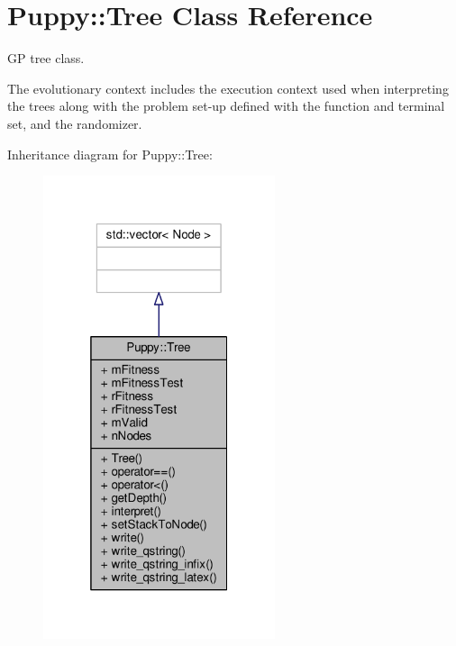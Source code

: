 \hypertarget{classPuppy_1_1Tree}{}\section{Puppy\+:\+:Tree Class Reference}
\label{classPuppy_1_1Tree}


G\+P tree class.

The evolutionary context includes the execution context used when interpreting the trees along with the problem set-\/up defined with the function and terminal set, and the randomizer.  




Inheritance diagram for Puppy\+:\+:Tree\+:
\nopagebreak
\begin{figure}[H]
\begin{center}
\leavevmode
\includegraphics[width=193pt]{classPuppy_1_1Tree__inherit__graph}
\end{center}
\end{figure}


